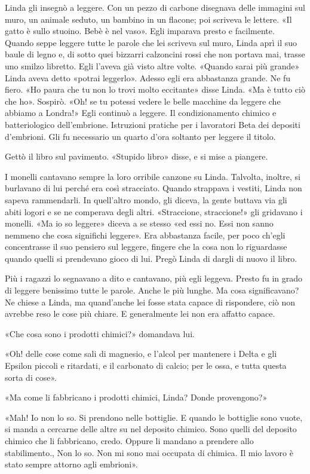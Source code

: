 \documentclass[
a5paper, %
10pt, %
twoside, 
onecolumn, %
openany, %
]{memoir}
\begin{document}
Linda gli insegnò a leggere. Con un pezzo di carbone disegnava delle immagini sul muro, un animale seduto, un bambino in un flacone; poi scriveva le lettere. «Il gatto è sullo stuoino. Bebè è nel vaso». Egli imparava presto e facilmente. Quando seppe leggere tutte le parole che lei scriveva sul muro, Linda aprì il suo baule di legno e, di sotto quei bizzarri calzoncini rossi che non portava mai, trasse uno smilzo libretto. Egli l’aveva già visto altre volte. «Quando sarai più grande» Linda aveva detto «potrai leggerlo». Adesso egli era abbastanza grande. Ne fu fiero. «Ho paura che tu non lo trovi molto eccitante» disse Linda. «Ma è tutto ciò che ho». Sospirò. «Oh! se tu potessi vedere le belle macchine da leggere che abbiamo a Londra!» Egli continuò a leggere. Il condizionamento chimico e batteriologico dell’embrione. Istruzioni pratiche per i lavoratori Beta dei depositi d’embrioni. Gli fu necessario un quarto d’ora soltanto per leggere il titolo.

Gettò il libro sul pavimento. «Stupido libro» disse, e si mise a piangere.

I monelli cantavano sempre la loro orribile canzone su Linda. Talvolta, inoltre, si burlavano di lui perché era così stracciato. Quando strappava i vestiti, Linda non sapeva rammendarli. In quell’altro mondo, gli diceva, la gente buttava via gli abiti logori e se ne comperava degli altri. «Straccione, straccione!» gli gridavano i monelli. «Ma io so leggere» diceva a se stesso «ed essi no. Essi non sanno nemmeno che cosa significhi leggere». Era abbastanza facile, per poco ch’egli concentrasse il suo pensiero sul leggere, fingere che la cosa non lo riguardasse quando quelli si prendevano gioco di lui. Pregò Linda di dargli di nuovo il libro.

Più i ragazzi lo segnavano a dito e cantavano, più egli leggeva. Presto fu in grado di leggere benissimo tutte le parole. Anche le più lunghe. Ma cosa significavano? Ne chiese a Linda, ma quand’anche lei fosse stata capace di rispondere, ciò non avrebbe reso le cose più chiare. E generalmente lei non era affatto capace.

«Che cosa sono i prodotti chimici?» domandava lui.

«Oh! delle cose come sali di magnesio, e l’alcol per mantenere i Delta e gli Epsilon piccoli e ritardati, e il carbonato di calcio; per le ossa, e tutta questa sorta di cose».

«Ma come li fabbricano i prodotti chimici, Linda? Donde provengono?»

«Mah! Io non lo so. Si prendono nelle bottiglie. E quando le bottiglie sono vuote, si manda a cercarne delle altre su nel deposito chimico. Sono quelli del deposito chimico che li fabbricano, credo. Oppure li mandano a prendere allo stabilimento., Non lo so. Non mi sono mai occupata di chimica. Il mio lavoro è stato sempre attorno agli embrioni».
\end{document}
